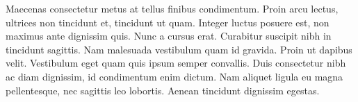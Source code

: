 Maecenas consectetur metus at tellus finibus condimentum. Proin arcu lectus, ultrices non
tincidunt et, tincidunt ut quam. Integer luctus posuere est, non maximus ante dignissim
quis. Nunc a cursus erat. Curabitur suscipit nibh in tincidunt sagittis. Nam malesuada
vestibulum quam id gravida. Proin ut dapibus velit. Vestibulum eget quam quis ipsum
semper convallis. Duis consectetur nibh ac diam dignissim, id condimentum enim dictum.
Nam aliquet ligula eu magna pellentesque, nec sagittis leo lobortis. Aenean tincidunt
dignissim egestas.
